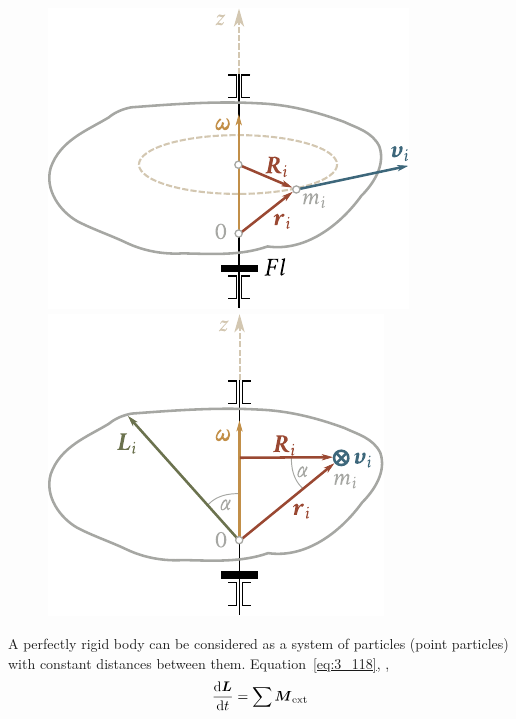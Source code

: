 \begin{figure}[t]
	\begin{minipage}[t]{0.5\linewidth}
		\begin{center}
			\includegraphics[scale=0.95]{figures/ch_05/fig_5_3.pdf}
			\caption[]{}
			\label{fig:5_3}
		\end{center}
	\end{minipage}
	\hspace{-0.05cm}
	\begin{minipage}[t]{0.5\linewidth}
		\begin{center}
			\includegraphics[scale=0.95]{figures/ch_05/fig_5_4.pdf}
			\caption[]{}
			\label{fig:5_4}
		\end{center}
	\end{minipage}
\vspace{-0.5cm}
\end{figure}

A perfectly rigid body can be considered as a system of particles (point particles) with constant distances between them. Equation~\eqref{eq:3_118}, \ie,
\begin{equation*}
\frac{\mathrm{d}\boldsymbol{L}}{\mathrm{d} t} = \sum \boldsymbol{M}_{\text{ext}}
\end{equation*}

